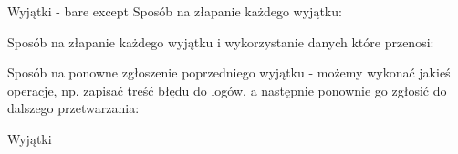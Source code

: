 \begin{frame}{Wyjątki - bare except}
    Sposób na złapanie każdego wyjątku:
    

    Sposób na złapanie każdego wyjątku i wykorzystanie danych które przenosi:
    

    Sposób na ponowne zgłoszenie poprzedniego wyjątku - możemy wykonać jakieś operacje, np. zapisać treść błędu do logów, a następnie ponownie go zgłosić do dalszego przetwarzania:
    
\end{frame}

\begin{frame}{Wyjątki}
    
\end{frame}
